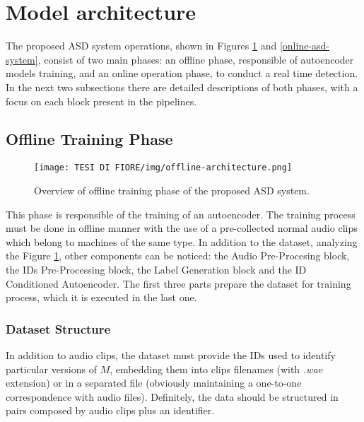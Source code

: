 \section{Model architecture}
The proposed ASD system operations, shown in Figures \ref{offline-asd-system} and \ref{online-asd-system}, consist of two main phases: an offline phase, responsible of autoencoder models training, and an online operation phase, to conduct a real time detection.\\
In the next two subsections there are detailed descriptions of both phases, with a focus on each block present in the pipelines.
\subsection{Offline Training Phase}
\begin{figure}[ht]
\texttt{[image: TESI DI FIORE/img/offline-architecture.png]}
\centering
\caption{Overview of offline training phase of the proposed ASD system.}
\label{offline-asd-system}
\end{figure}
This phase is responsible of the training of an autoencoder. The training process must be done in offline manner with the use of a pre-collected normal audio clips which belong to machines of the same type. In addition to the dataset, analyzing the Figure \ref{offline-asd-system}, other components can be noticed: the Audio Pre-Procesing block, the IDs Pre-Processing block, the Label Generation block and the ID Conditioned Autoencoder. The first three parts prepare the dataset for training process, which it is executed in the last one.
\subsubsection{Dataset Structure}
In addition to audio clips, the dataset must provide the IDs used to identify particular versions of $M$, embedding them into clips filenames (with \textit{.wav} extension) or in a separated file (obviously maintaining a one-to-one correspondence with audio files). Definitely, the data should be structured in pairs composed by audio clips plus an identifier.
